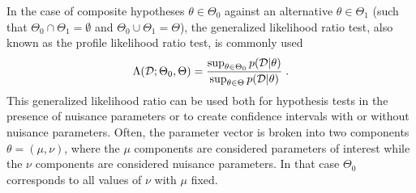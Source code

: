 \documentclass[12pt]{article}
\numberwithin{equation}{section}
\theoremstyle{plain}
\begin{document}

In the case of composite hypotheses $\theta \in \Theta_0$ against an alternative
$\theta \in \Theta_1$ (such that $\Theta_0 \cap \Theta_1 = \emptyset$ and $\Theta_0 \cup \Theta_1 = \Theta$), the
generalized likelihood ratio test, also known as the profile likelihood ratio
test, is commonly used
\begin{equation}\label{eqn:generalized-lr}
\Lambda({\cal D}; \Theta_0, \Theta) =  \frac{ \sup_{\theta \in \Theta_0} p({\cal D} | \theta)}{ \sup_{\theta \in \Theta} p({\cal D} | \theta)} \; .
\end{equation}
This generalized likelihood ratio can be used both for hypothesis tests in the
presence of nuisance parameters or to create confidence intervals with or
without nuisance parameters.  Often, the parameter vector is broken into two
components $\theta=(\mu,\nu)$, where the $\mu$ components are considered
parameters of interest while the $\nu$ components are considered nuisance
parameters. In that case $\Theta_0$ corresponds to all values of $\nu$ with
$\mu$ fixed.
\end{document}
